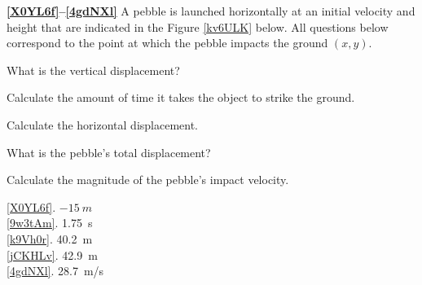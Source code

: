 \documentclass[dvipsnames]{article}
\begin{document}
\textbf{\ref{X0YL6f}--\ref{4gdNXl}} A pebble is launched horizontally at an initial velocity and height that are indicated in the Figure \ref{kv6ULK} below. All questions below correspond to the point at which the pebble impacts the ground $(x,y)$.

\begin{center}
    \captionsetup{type=figure,margin=1in,font=scriptsize}
    \label{kv6ULK}
\end{center}

\begin{exercise} \label{X0YL6f}
    What is the vertical displacement?
\end{exercise}

\begin{exercise} \label{9w3tAm}
    Calculate the amount of time it takes the object to strike the ground.
\end{exercise}

\begin{exercise} \label{k9Vh0r}
    Calculate the horizontal displacement. 
\end{exercise}

\begin{exercise} \label{jCKHLv}
    What is the pebble's total displacement?
\end{exercise}

\begin{exercise} \label{4gdNXl}
    Calculate the magnitude of the pebble's impact velocity.
\end{exercise}

\ref{X0YL6f}. $-\SI{15}{m}$\\
\ref{9w3tAm}. \SI{1.75}{s}\\
\ref{k9Vh0r}. \SI{40.2}{m}\\
\ref{jCKHLv}. \SI{42.9}{m}\\
\ref{4gdNXl}. \SI{28.7}{m/s}\\
\end{document}
